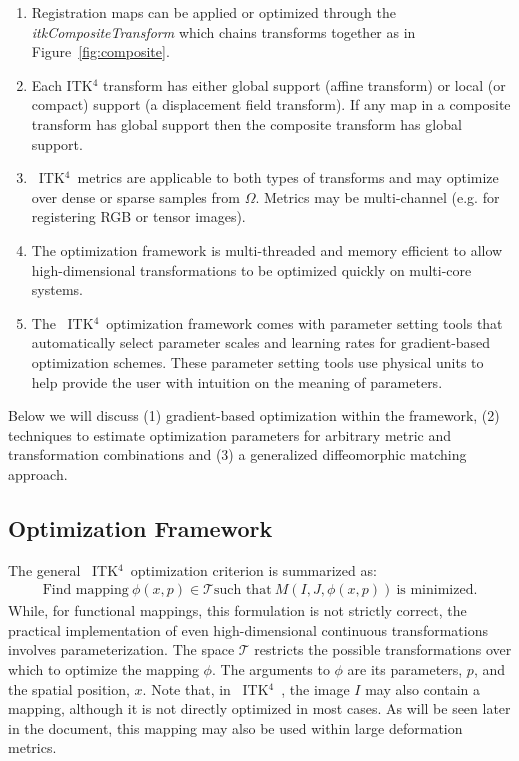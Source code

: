 \documentclass{llncs}
\newcommand{\tk}{~ITK$^{\text{4}}$~}
\begin{document}
\begin{enumerate}
\item Registration maps can be applied or optimized through the {\em
    itkCompositeTransform} which chains transforms together as in Figure~\ref{fig:composite}.
\item Each ITK$^4$ transform has either global support (affine
  transform) or local (or compact) support (a displacement field transform).   If
  any map in a composite transform has global support then the
  composite transform has global support. 
\item \tk metrics are applicable to both types of transforms and may
  optimize over dense or sparse samples from $\Omega$.  Metrics may be
  multi-channel (e.g. for registering RGB or tensor images).
\item The optimization framework is multi-threaded and memory
  efficient to allow high-dimensional transformations to be optimized
  quickly on multi-core systems.
\item The \tk optimization framework comes with parameter setting tools
  that automatically select parameter scales and learning rates for
  gradient-based optimization schemes.  These parameter setting tools
  use physical units to help provide the user with intuition on the
  meaning of parameters.  
\end{enumerate}
Below we will discuss (1) gradient-based optimization within the
framework, (2) techniques to estimate optimization parameters for
arbitrary metric and transformation combinations and (3) a generalized
diffeomorphic matching approach.  

\subsection{Optimization Framework}
The general \tk optimization criterion is summarized as:
\begin{eqnarray}
\text{Find mapping}~\phi(x,p) \in \mathcal{T}
\text{such that}~M(I,J,\phi(x,p))~\text{is minimized}. 
\label{eq:gen}
\end{eqnarray}
While, for functional mappings, this formulation is not strictly correct, the
practical implementation of even high-dimensional continuous
transformations involves parameterization. 
The space $\mathcal{T}$ restricts the possible transformations over
which to optimize the mapping $\phi$.  The arguments to $\phi$ are its
parameters, $p$, and the spatial position, $x$.  Note that, in \tk,
the image $I$ may also contain a mapping, although it is not directly
optimized in most cases.  As will be seen later in the document, this
mapping may also be used within large deformation metrics. 
\end{document}
